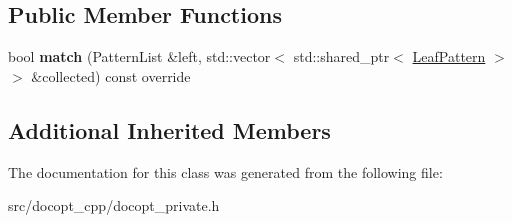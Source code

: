 \subsection*{Public Member Functions}
\begin{DoxyCompactItemize}
\item 
\mbox{\label{classdocopt_1_1Optional_a64812d6b139119fb065b740099d7448d}} 
bool {\bfseries match} (Pattern\+List \&left, std\+::vector$<$ std\+::shared\+\_\+ptr$<$ \hyperlink{classdocopt_1_1LeafPattern}{Leaf\+Pattern} $>$$>$ \&collected) const override
\end{DoxyCompactItemize}
\subsection*{Additional Inherited Members}


The documentation for this class was generated from the following file\+:\begin{DoxyCompactItemize}
\item 
src/docopt\+\_\+cpp/docopt\+\_\+private.\+h\end{DoxyCompactItemize}
